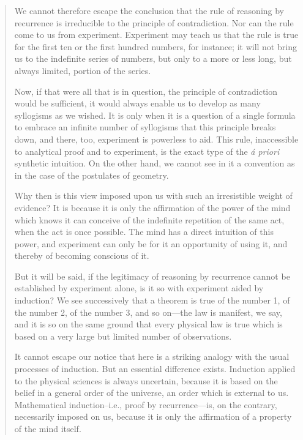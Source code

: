 \documentclass{article}
\begin{document}
\begin{quote}
    We cannot therefore escape the conclusion that the rule of reasoning by recurrence is irreducible to the principle of contradiction.  Nor can the rule come to us from experiment.  Experiment may teach us that the rule is true for the first ten or the first hundred numbers, for instance; it will not bring us to the indefinite series of numbers, but only to a more or less long, but always limited, portion of the series.  
    
    Now, if that were all that is in question, the principle of contradiction would be sufficient, it would always enable us to develop as many syllogisms as we wished.  It is only when it is a question of a single formula to embrace an infinite number of syllogisms that this principle breaks down, and there, too, experiment is powerless to aid.  This rule, inaccessible to analytical proof and to experiment, is the exact type of the \emph{\'a priori} synthetic intuition.  On the other hand, we cannot see in it a convention as in the case of the postulates of geometry.
    
    Why then is this view imposed upon us with such an irresistible weight of evidence?  It is because it is only the affirmation of the power of the mind which knows it can conceive of the indefinite repetition of the same act, when the act is once possible.  The mind has a direct intuition of this power, and experiment can only be for it an opportunity of using it, and thereby of becoming conscious of it. 
    
    But it will be said, if the legitimacy of reasoning by recurrence cannot be established by experiment alone, is it so with experiment aided by induction?  We see successively that a theorem is true of the number 1, of the number 2, of the number 3, and so on---the law is manifest, we say, and it is so on the same ground that every physical law is true which is based on a very large but limited number of observations.
    
    It cannot escape our notice that here is a striking analogy with the usual processes of induction.  But an essential difference exists.  Induction applied to the physical sciences is always uncertain, because it is based on the belief in a general order of the universe, an order which is external to us.  Mathematical induction--i.e., proof by recurrence---is, on the contrary, necessarily imposed on us, because it is only the affirmation of a property of the mind itself.\citep[p. 12-13]{Poincare1952}
\end{quote}
\end{document}
